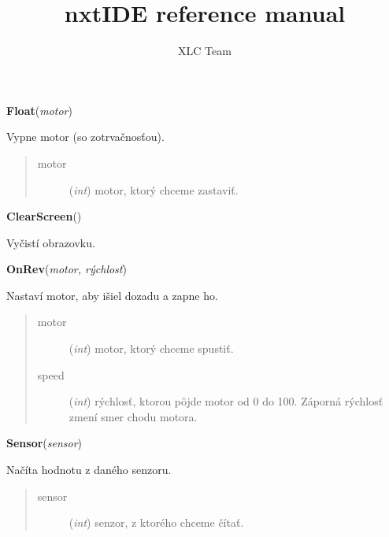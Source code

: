 \documentclass[10pt,a4paper]{article}
\title{nxtIDE reference manual}
\author{XLC Team}
\date{}
\begin{document}
\maketitle

\vspace{6pt}
{\bf Float}({\it motor}) 
    
    Vypne motor (so zotrvačnosťou).


    

\begin{quote}
    \begin{description}
        
\item[motor] ({\emph{int}}) motor, ktorý chceme zastaviť.

    \end{description}
\end{quote}

 

\vspace{6pt}
{\bf ClearScreen}({\it }) 

    Vyčistí obrazovku.
    
 

\vspace{6pt}
{\bf OnRev}({\it motor, rýchlosť}) 
    
    Nastaví motor, aby išiel dozadu a zapne ho.
    


    

\begin{quote}
    \begin{description}
        
\item[motor] ({\emph{int}}) motor, ktorý chceme spustiť.

\item[speed] ({\emph{int}}) rýchlosť, ktorou pôjde motor od 0 do 100. Záporná rýchlosť zmení smer chodu motora.

    \end{description}
\end{quote}

 

\vspace{6pt}
{\bf Sensor}({\it sensor}) 
    
    Načíta hodnotu z daného senzoru.
    

    

\begin{quote}
    \begin{description}
        
\item[sensor] ({\emph{int}}) senzor, z ktorého chceme čítať.

    \end{description}
\end{quote}
\end{document}
